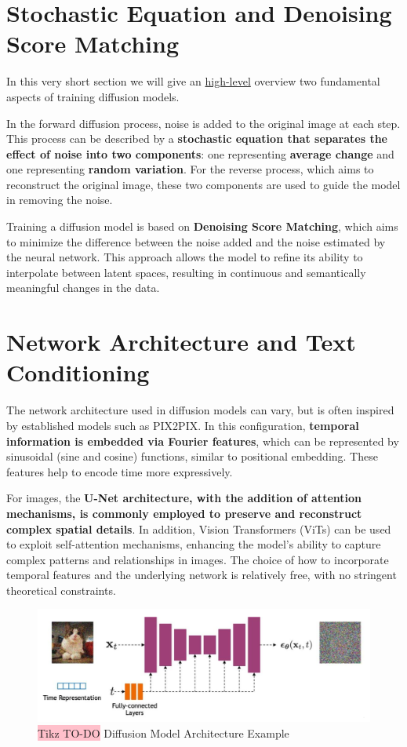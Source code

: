 \section{Stochastic Equation and Denoising Score Matching}

In this very short section we will give an \underline{high-level} overview two fundamental aspects of training diffusion models.

In the forward diffusion process, noise is added to the original image at each step. This process can be described by a \textbf{stochastic equation that separates the effect of noise into two components}: one representing \textbf{average change} and one representing \textbf{random variation}. For the reverse process, which aims to reconstruct the original image, these two components are used to guide the model in removing the noise.

Training a diffusion model is based on \textbf{Denoising Score Matching}, which aims to minimize the difference between the noise added and the noise estimated by the neural network. This approach allows the model to refine its ability to interpolate between latent spaces, resulting in continuous and semantically meaningful changes in the data.

\section{Network Architecture and Text Conditioning}

The network architecture used in diffusion models can vary, but is often inspired by established models such as PIX2PIX. In this configuration, \textbf{temporal information is embedded via Fourier features}, which can be represented by sinusoidal (sine and cosine) functions, similar to positional embedding. These features help to encode time more expressively. 

For images, the \textbf{U-Net architecture, with the addition of attention mechanisms, is commonly employed to preserve and reconstruct complex spatial details}. In addition, Vision Transformers (ViTs) can be used to exploit self-attention mechanisms, enhancing the model's ability to capture complex patterns and relationships in images. The choice of how to incorporate temporal features and the underlying network is relatively free, with no stringent theoretical constraints.

\begin{figure}[!htbp]
    \centering
    \includegraphics[width=\linewidth]{tikz/chapter10 - Diffusion Models Network Architecture.png}
    \caption{{\color{red}\colorbox{pink}{Tikz TO-DO}} Diffusion Model Architecture Example}
\end{figure}

